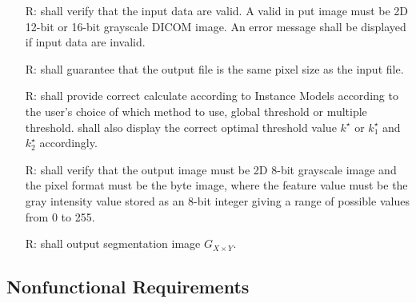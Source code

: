\documentclass[12pt]{article}
\newcounter{reqnum} %
\begin{document}
\noindent \begin{itemize}

\item[R\refstepcounter{reqnum}\thereqnum \label{R_Inputs}:] 
\famname{} shall verify that the input data are valid. A valid in put image must be 2D 12-bit or 16-bit grayscale DICOM image. An error message shall be displayed if input data are invalid.

\item[R\refstepcounter{reqnum}\thereqnum \label{R_OutputInputs}:] 
\famname{} shall guarantee that the output file is the same pixel size as the input file.

\item[R\refstepcounter{reqnum}\thereqnum \label{R_Calculate}:]
\famname{} shall provide correct calculate according to Instance Models according to the user's choice of which method to use, global threshold or multiple threshold. \famname{} shall also display the correct optimal threshold value $k^{\star}$ or $k^{\star}_{1}$ and $k^{\star}_{2}$ accordingly. 

\item[R\refstepcounter{reqnum}\thereqnum \label{R_VerifyOutput}:]
\famname{} shall verify that the output image must be 2D 8-bit grayscale image and the pixel format must be the byte image, where the feature value must be the gray intensity value stored as an 8-bit integer giving a range of possible values from 0 to 255.

\item[R\refstepcounter{reqnum}\thereqnum \label{R_Outputk}:] 
\famname{} shall output segmentation image $G_{X \times Y}$.

\end{itemize}

\subsection{Nonfunctional Requirements}
\end{document}
